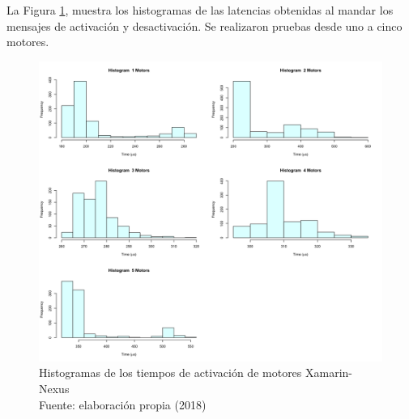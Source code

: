 La Figura \ref{fig:xamarin-nexus-hist-motors}, muestra los histogramas de las latencias obtenidas al mandar los mensajes de activación y desactivación. Se realizaron pruebas desde uno a cinco motores.

\begin{figure}
 \begin{center} 
   	\includegraphics[width=1.0\textwidth]{evaluation/graphics/Xamarin/Nexus/HistMotorsXamarinNexus.png} 
   	\captionsetup{justification=centering}
    \caption[Histogramas de los tiempos de activación de motores Xamarin-Nexus]{Histogramas de los tiempos de activación de motores  Xamarin-Nexus\\Fuente: elaboración propia (2018)} 
    \label{fig:xamarin-nexus-hist-motors}
  \end{center}
\end{figure}

